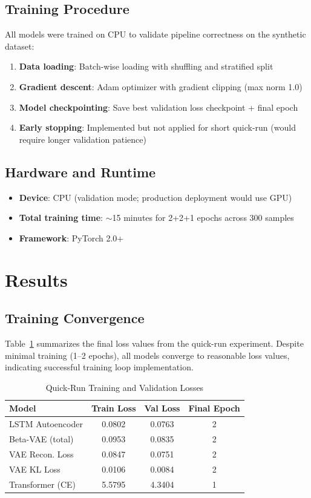 \documentclass[conference]{IEEEtran}
\begin{document}
\subsection{Training Procedure}
All models were trained on CPU to validate pipeline correctness on the synthetic dataset:
\begin{enumerate}
    \item \textbf{Data loading}: Batch-wise loading with shuffling and stratified split
    \item \textbf{Gradient descent}: Adam optimizer with gradient clipping (max norm 1.0)
    \item \textbf{Model checkpointing}: Save best validation loss checkpoint + final epoch
    \item \textbf{Early stopping}: Implemented but not applied for short quick-run (would require longer validation patience)
\end{enumerate}

\subsection{Hardware and Runtime}
\begin{itemize}
    \item \textbf{Device}: CPU (validation mode; production deployment would use GPU)
    \item \textbf{Total training time}: $\sim$15 minutes for 2+2+1 epochs across 300 samples
    \item \textbf{Framework}: PyTorch 2.0+
\end{itemize}

\section{Results}

\subsection{Training Convergence}
Table~\ref{tab:losses} summarizes the final loss values from the quick-run experiment. Despite minimal training (1--2 epochs), all models converge to reasonable loss values, indicating successful training loop implementation.

\begin{table}[h]
\centering
\caption{Quick-Run Training and Validation Losses}
\label{tab:losses}
\begin{tabular}{lccc}
\toprule
\textbf{Model} & \textbf{Train Loss} & \textbf{Val Loss} & \textbf{Final Epoch} \\
\midrule
LSTM Autoencoder & 0.0802 & 0.0763 & 2 \\
Beta-VAE (total) & 0.0953 & 0.0835 & 2 \\
VAE Recon. Loss & 0.0847 & 0.0751 & 2 \\
VAE KL Loss & 0.0106 & 0.0084 & 2 \\
Transformer (CE) & 5.5795 & 4.3404 & 1 \\
\bottomrule
\end{tabular}
\end{table}
\end{document}
